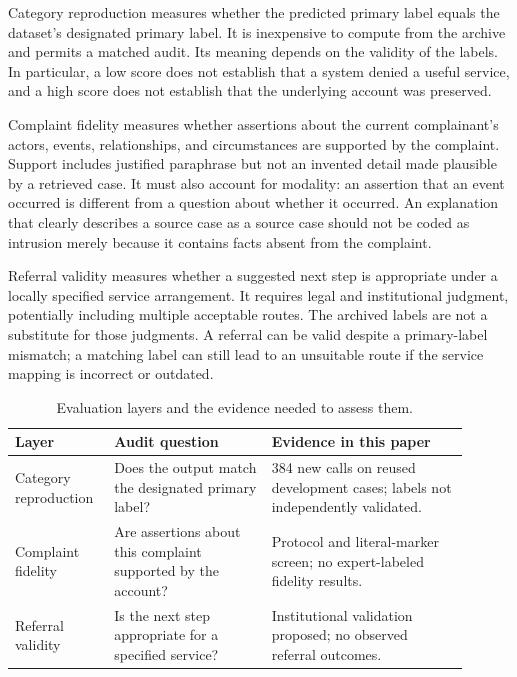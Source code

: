 \documentclass[manuscript,screen,review,anonymous]{acmart}
\begin{document}
Category reproduction measures whether the predicted primary label equals the dataset's designated primary label. It is inexpensive to compute from the archive and permits a matched audit. Its meaning depends on the validity of the labels. In particular, a low score does not establish that a system denied a useful service, and a high score does not establish that the underlying account was preserved.

Complaint fidelity measures whether assertions about the current complainant's actors, events, relationships, and circumstances are supported by the complaint. Support includes justified paraphrase but not an invented detail made plausible by a retrieved case. It must also account for modality: an assertion that an event occurred is different from a question about whether it occurred. An explanation that clearly describes a source case as a source case should not be coded as intrusion merely because it contains facts absent from the complaint.

Referral validity measures whether a suggested next step is appropriate under a locally specified service arrangement. It requires legal and institutional judgment, potentially including multiple acceptable routes. The archived labels are not a substitute for those judgments. A referral can be valid despite a primary-label mismatch; a matching label can still lead to an unsuitable route if the service mapping is incorrect or outdated.
\begin{table}[htbp]
\caption{Evaluation layers and the evidence needed to assess them.}
\label{tab:framework}
\centering
\begin{tabular}{@{}p{0.18\linewidth}p{0.32\linewidth}p{0.4\linewidth}@{}}
\toprule
Layer & Audit question & Evidence in this paper \\
\midrule
Category reproduction & Does the output match the designated primary label? & 384 new calls on reused development cases; labels not independently validated. \\
Complaint fidelity & Are assertions about this complaint supported by the account? & Protocol and literal-marker screen; no expert-labeled fidelity results. \\
Referral validity & Is the next step appropriate for a specified service? & Institutional validation proposed; no observed referral outcomes. \\
\bottomrule
\end{tabular}
\end{table}
\end{document}
